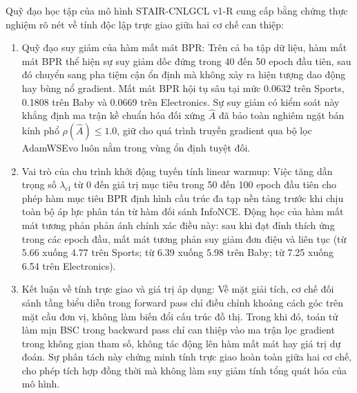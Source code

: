 Quỹ đạo học tập của mô hình STAIR-CNLGCL v1-R cung cấp bằng chứng thực nghiệm rõ nét về tính độc lập trực giao giữa hai cơ chế can thiệp:
\begin{enumerate}[leftmargin=*]
    \item Quỹ đạo suy giảm của hàm mất mát BPR: Trên cả ba tập dữ liệu, hàm mất mát BPR thể hiện sự suy giảm dốc đứng trong 40 đến 50 epoch đầu tiên, sau đó chuyển sang pha tiệm cận ổn định mà không xảy ra hiện tượng dao động hay bùng nổ gradient. Mất mát BPR hội tụ sâu tại mức 0.0632 trên Sports, 0.1808 trên Baby và 0.0669 trên Electronics. Sự suy giảm có kiểm soát này khẳng định ma trận kề chuẩn hóa đối xứng $\hat{A}$ đã bảo toàn nghiêm ngặt bán kính phổ $\rho(\hat{A}) \le 1.0$, giữ cho quá trình truyền gradient qua bộ lọc AdamWSEvo luôn nằm trong vùng ổn định tuyệt đối.
    \item Vai trò của chu trình khởi động tuyến tính linear warmup: Việc tăng dần trọng số $\lambda_{\text{cl}}$ từ 0 đến giá trị mục tiêu trong 50 đến 100 epoch đầu tiên cho phép hàm mục tiêu BPR định hình cấu trúc đa tạp nền tảng trước khi chịu toàn bộ áp lực phân tán từ hàm đối sánh InfoNCE. Động học của hàm mất mát tương phản phản ánh chính xác điều này: sau khi đạt đỉnh thích ứng trong các epoch đầu, mất mát tương phản suy giảm đơn điệu và liên tục (từ 5.66 xuống 4.77 trên Sports; từ 6.39 xuống 5.98 trên Baby; từ 7.25 xuống 6.54 trên Electronics).
    \item Kết luận về tính trực giao và giá trị áp dụng: Về mặt giải tích, cơ chế đối sánh tầng biểu diễn trong forward pass chỉ điều chỉnh khoảng cách góc trên mặt cầu đơn vị, không làm biến đổi cấu trúc đồ thị. Trong khi đó, toán tử làm mịn BSC trong backward pass chỉ can thiệp vào ma trận lọc gradient trong không gian tham số, không tác động lên hàm mất mát hay giá trị dự đoán. Sự phân tách này chứng minh tính trực giao hoàn toàn giữa hai cơ chế, cho phép tích hợp đồng thời mà không làm suy giảm tính tổng quát hóa của mô hình.
\end{enumerate}

\clearpage